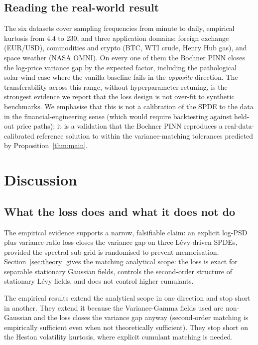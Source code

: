 \documentclass[review,12pt]{elsarticle}
\begin{document}
\subsection{Reading the real-world result}

The six datasets cover sampling frequencies from minute to daily,
empirical kurtosis from \(4.4\) to \(230\), and three application
domains: foreign exchange (EUR/USD), commodities and crypto (BTC,
WTI crude, Henry Hub gas), and space weather (NASA OMNI). On every
one of them the Bochner PINN closes the log-price variance gap by
the expected factor, including the pathological solar-wind case
where the vanilla baseline fails in the \emph{opposite} direction.
The transferability across this range, without
hyperparameter retuning, is the strongest evidence we report
that the loss design is not over-fit to synthetic benchmarks. We
emphasise that this is not a calibration of the SPDE to the data in
the financial-engineering sense (which would require backtesting
against held-out price paths); it is a validation that the Bochner
PINN reproduces a real-data-calibrated reference solution to
within the variance-matching tolerances predicted by
Proposition~\ref{thm:main}.

\section{Discussion}
\label{sec:discussion}

\subsection{What the loss does and what it does not do}

The empirical evidence supports a narrow, falsifiable claim: an
explicit log-PSD plus variance-ratio loss closes the variance gap
on three L\'evy-driven SPDEs, provided the spectral sub-grid is
randomised to prevent memorisation. Section~\ref{sec:theory} gives
the matching analytical scope: the loss is exact for separable
stationary Gaussian fields, controls the second-order structure of
stationary L\'evy fields, and does not control higher cumulants.

The empirical results extend the analytical scope in one direction
and stop short in another. They extend it because the
Variance-Gamma fields used are non-Gaussian and the loss closes
the variance gap anyway (second-order matching is empirically
sufficient even when not theoretically sufficient). They stop
short on the Heston volatility kurtosis, where explicit cumulant
matching is needed.
\end{document}
